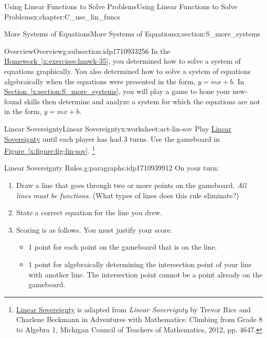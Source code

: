 \documentclass[oneside,10pt,]{book}
\newcommand{\xreffont}{\relax}
\newcommand{\pubtitle}[1]{\textsl{#1}}
\numberwithin{equation}{chapter}
\begin{document}
\begin{chapterptx}{Using Linear Functions to Solve Problems}{}{Using Linear Functions to Solve Problems}{}{}{x:chapter:C_use_lin_funcs}
\begin{sectionptx}{More Systems of Equations}{}{More Systems of Equations}{}{}{x:section:S_more_systems}
%
%
\typeout{************************************************}
\typeout{************************************************}
%
\begin{subsectionptx}{Overview}{}{Overview}{}{}{g:subsection:idp1710933256}
In the \hyperref[x:exercises:hmwk-35]{Homework~{\xreffont\ref{x:exercises:hmwk-35}}}, you determined how to solve a system of equations graphically. You also determined how to solve a system of equations algebraically when the equations were presented in the form, \(y = mx + b\). In \hyperref[x:section:S_more_systems]{Section~{\xreffont\ref{x:section:S_more_systems}}}, you will play a game to hone your new-found skills then determine and analyze a system for which the equations are not in the form, \(y = mx + b\).%
\end{subsectionptx}
%
%
\typeout{************************************************}
\typeout{************************************************}
%
\begin{worksheet-subsection}{Linear Sovereignty}{}{Linear Sovereignty}{}{}{x:worksheet:act-lin-sov}
Play \hyperref[x:worksheet:act-lin-sov]{Linear Sovereignty} until each player has had 3 turns. Use the gameboard in \hyperref[x:figure:fig-lin-sov]{Figure~{\xreffont\ref{x:figure:fig-lin-sov}}}. \footnote{\hyperref[x:worksheet:act-lin-sov]{Linear Sovereignty} is adapted from \pubtitle{Linear Sovereignty} by Trevor Rice and Charlene Beckmann in Adventures with Mathematics: Climbing from Grade 8 to Algebra 1, Michigan Council of Teachers of Mathematics, 2012, pp. 46\textemdash{}47.\label{g:fn:idp1710942984}}%
\begin{paragraphs}{Linear Sovereignty Rules.}{g:paragraphs:idp1710939912}%
On your turn:%
\begin{enumerate}[label=(\alph*)]
\item{}Draw a line that goes through two or more points on the gameboard. \emph{All lines must be functions}. (What types of lines does this rule eliminate?)%
\item{}State a correct equation for the line you drew.%
\item{}Scoring is as follows. You must justify your score.%
\begin{itemize}[label=\textbullet]
\item{}1 point for each point on the gameboard that is on the line.%
\item{}1 point for algebraically determining the intersection point of your line with another line. The intersection point cannot be a point already on the gameboard.%

\end{itemize}
\end{enumerate}
\end{paragraphs}
\end{worksheet-subsection}
\end{sectionptx}
\end{chapterptx}
\end{document}
